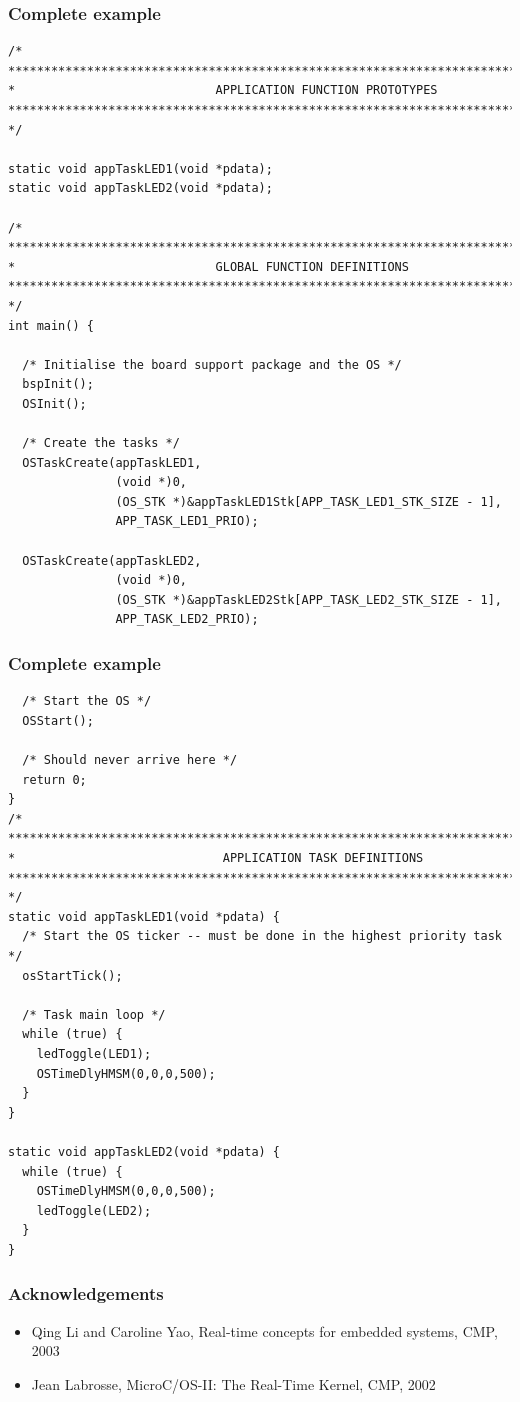 \documentclass[hyperref={pdfpagelabels=false},svgnames]{beamer}
\begin{document}
\begin{frame}[fragile]
\frametitle{Complete example}

\begin{lstlisting}
/*
********************************************************************************
*                            APPLICATION FUNCTION PROTOTYPES
********************************************************************************
*/

static void appTaskLED1(void *pdata);
static void appTaskLED2(void *pdata);

/*
********************************************************************************
*                            GLOBAL FUNCTION DEFINITIONS
********************************************************************************
*/
int main() {

  /* Initialise the board support package and the OS */
  bspInit();
  OSInit();                                                   

  /* Create the tasks */
  OSTaskCreate(appTaskLED1,                               
               (void *)0,
               (OS_STK *)&appTaskLED1Stk[APP_TASK_LED1_STK_SIZE - 1],
               APP_TASK_LED1_PRIO);
  
  OSTaskCreate(appTaskLED2,                               
               (void *)0,
               (OS_STK *)&appTaskLED2Stk[APP_TASK_LED2_STK_SIZE - 1],
               APP_TASK_LED2_PRIO);
\end{lstlisting}

\end{frame}

\begin{frame}[fragile]
\frametitle{Complete example}

\begin{lstlisting}
  /* Start the OS */
  OSStart();                                                  
  
  /* Should never arrive here */ 
  return 0;      
}
/*
*********************************************************************************
*                             APPLICATION TASK DEFINITIONS
*********************************************************************************
*/
static void appTaskLED1(void *pdata) {
  /* Start the OS ticker -- must be done in the highest priority task */
  osStartTick();
  
  /* Task main loop */
  while (true) {
    ledToggle(LED1);
    OSTimeDlyHMSM(0,0,0,500);
  }
}

static void appTaskLED2(void *pdata) {
  while (true) {
    OSTimeDlyHMSM(0,0,0,500);
    ledToggle(LED2);
  } 
}
\end{lstlisting}

\end{frame}


\begin{frame}
\frametitle{Acknowledgements}
\begin{itemize}
\item Qing Li and Caroline Yao, Real-time concepts for embedded systems, CMP, 2003
\item Jean Labrosse, MicroC/OS-II: The Real-Time Kernel, CMP, 2002
\end{itemize}
\end{frame}
\end{document}
